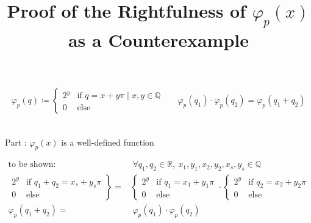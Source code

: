 \documentclass[12pt, a4paper]{article}
\newcommand{\rom}[1]{\uppercase\expandafter{\romannumeral #1\relax}}
\begin{document}
\title{Proof of the Rightfulness of $\varphi_p(x)$ as a Counterexample}
\author{}
\date{}
\maketitle
\vspace*{-1.9cm}
\centering
\begin{align*}
\varphi_p(q) \coloneqq \left\{\begin{array}{rl}2^{y} & \text{if } q = x + y\pi \mid x,y\in\mathbb{Q}\\ 0& \text{else}\end{array}\right. & & \varphi_p(q_1)\cdot\varphi_p(q_2) = \varphi_p(q_1+q_2)
\end{align*}\\\vspace*{7mm}
\begin{Large}Part \rom{1}: $\varphi_p(x)$ is a well-defined function\end{Large}
\begin{align*}
\text{to be shown:~~~~}&~\forall q_1,q_2\in \mathbb{R},~ x_1,y_1,x_2,y_2,x_s,y_s\in\mathbb{Q}\\
\left.\begin{array}{rl}2^{y} & \text{if } q_1+q_2 = x_s + y_s\pi\\ 0& \text{else}\end{array}\right\} =& \left\{\begin{array}{rl}2^{y} & \text{if } q_1 = x_1 + y_1\pi \\ 0& \text{else}\end{array}\right.\cdot\left\{\begin{array}{rl}2^{y} & \text{if } q_2 = x_2 + y_2\pi \\ 0& \text{else}\end{array}\right.\\
\varphi_p(q_1 + q_2)  =& ~\varphi_p(q_1) \cdot \varphi_p(q_2)\\
\end{align*}\vspace*{-15mm}
\end{document}

